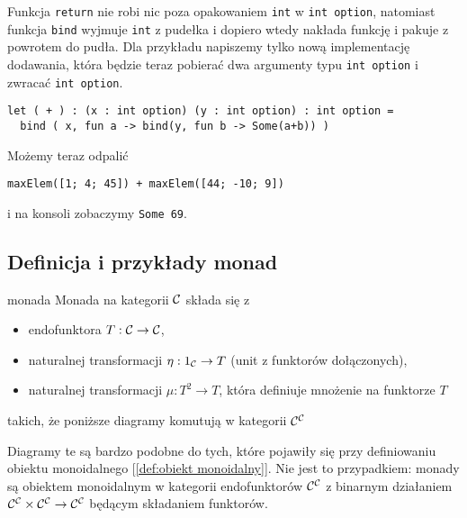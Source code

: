 Funkcja \lstinline{return} nie robi nic poza opakowaniem \lstinline{int} w \lstinline{int option}, natomiast funkcja \lstinline{bind} wyjmuje \lstinline{int} z pudełka i dopiero wtedy nakłada funkcję i pakuje z powrotem do pudła. Dla przykładu napiszemy tylko nową implementację dodawania, która będzie teraz pobierać dwa argumenty typu \lstinline{int option} i zwracać \lstinline{int option}.

\begin{lstlisting}
let ( + ) : (x : int option) (y : int option) : int option = 
  bind ( x, fun a -> bind(y, fun b -> Some(a+b)) )
\end{lstlisting}

Możemy teraz odpalić
\begin{lstlisting}
maxElem([1; 4; 45]) + maxElem([44; -10; 9])
\end{lstlisting}
i na konsoli zobaczymy \lstinline{Some 69}.

\subsection{Definicja i przykłady monad}

\begin{definition}{monada}{}
  Monada na kategorii $\mathcal{C}$ składa się z
  \begin{itemize}
    \item endofunktora $T:\mathcal{C}\to\mathcal{C}$,
    \item naturalnej transformacji $\eta:1_{\mathcal{C}}\to T$ (unit z funktorów dołączonych),
    \item naturalnej transformacji $\mu:T^2\to T$, która definiuje mnożenie na funktorze $T$
  \end{itemize}
  takich, że poniższe diagramy komutują w kategorii $\mathcal{C}^{\mathcal{C}}$
  \begin{center}
  \end{center}
\end{definition}

Diagramy te są bardzo podobne do tych, które pojawiły się przy definiowaniu obiektu monoidalnego [\ref{def:obiekt monoidalny}]. Nie jest to przypadkiem: monady są obiektem monoidalnym w kategorii endofunktorów $\mathcal{C}^{\mathcal{C}}$ z binarnym działaniem $\mathcal{C}^{\mathcal{C}}\times\mathcal{C}^{\mathcal{C}}\to \mathcal{C}^{\mathcal{C}}$ będącym składaniem funktorów.

